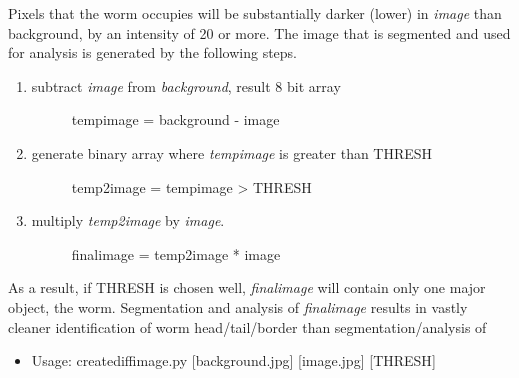 \documentclass[letterpaper,10pt,oneside]{sphinxmanual}
\begin{document}
Pixels that the worm occupies will be substantially darker (lower) in \emph{image} 
than background, by an intensity of 20 or more.  The image that is segmented 
and used for analysis is generated by the following steps.
\begin{enumerate}
\item {} \begin{description}
\item[{subtract \emph{image} from \emph{background}, result 8 bit array}] \leavevmode
tempimage = background - image

\end{description}

\item {} \begin{description}
\item[{generate binary array where \emph{tempimage} is greater than THRESH}] \leavevmode
temp2image = tempimage \textgreater{} THRESH

\end{description}

\item {} \begin{description}
\item[{multiply \emph{temp2image} by \emph{image}.  }] \leavevmode
finalimage = temp2image * image

\end{description}

\end{enumerate}

As a result, if THRESH is chosen well, \emph{finalimage} will contain only one major 
object, the worm.  Segmentation and analysis of \emph{finalimage} results in vastly
cleaner identification of worm head/tail/border than segmentation/analysis of
\begin{itemize}
\item {} 
Usage:  creatediffimage.py {[}background.jpg{]} {[}image.jpg{]} {[}THRESH{]}

\end{itemize}

\label{index:module-preprocessajp}
\end{document}
